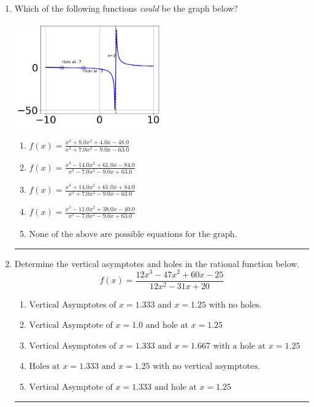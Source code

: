 \documentclass[14pt]{extbook}
\newcommand{\litem}[1]{\item#1\hspace*{-1cm}\rule{\textwidth}{0.4pt}}
\begin{document}
\begin{enumerate}
{\begin{enumerate}[label=\Alph*.]
\end{enumerate} }
\litem{
Which of the following functions \textit{could} be the graph below?
\begin{center}
    \includegraphics[width=0.5\textwidth]{../Figures/identifyGraphOfRationalFunctionCopyA.png}
\end{center}
\begin{enumerate}[label=\Alph*.]
\item \( f(x)=\frac{x^{3} +8.0 x^{2} +4.0 x -48.0}{x^{3} +7.0 x^{2} -9.0 x -63.0} \)
\item \( f(x)=\frac{x^{3} -14.0 x^{2} +61.0 x -84.0}{x^{3} -7.0 x^{2} -9.0 x + 63.0} \)
\item \( f(x)=\frac{x^{3} +14.0 x^{2} +61.0 x + 84.0}{x^{3} +7.0 x^{2} -9.0 x -63.0} \)
\item \( f(x)=\frac{x^{3} -11.0 x^{2} +38.0 x -40.0}{x^{3} -7.0 x^{2} -9.0 x + 63.0} \)
\item \( \text{None of the above are possible equations for the graph.} \)

\end{enumerate} }
\litem{
Determine the vertical asymptotes and holes in the rational function below.\[ f(x) = \frac{12x^{3} -47 x^{2} +60 x -25}{12x^{2} -31 x + 20} \]\begin{enumerate}[label=\Alph*.]
\item \( \text{Vertical Asymptotes of } x = 1.333 \text{ and } x = 1.25 \text{ with no holes.} \)
\item \( \text{Vertical Asymptote of } x = 1.0 \text{ and hole at } x = 1.25 \)
\item \( \text{Vertical Asymptotes of } x = 1.333 \text{ and } x = 1.667 \text{ with a hole at } x = 1.25 \)
\item \( \text{Holes at } x = 1.333 \text{ and } x = 1.25 \text{ with no vertical asymptotes.} \)
\item \( \text{Vertical Asymptote of } x = 1.333 \text{ and hole at } x = 1.25 \)


\end{enumerate}}
\end{enumerate}
\end{document}
